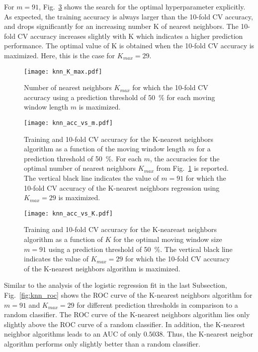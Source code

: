 For $m=91$, Fig.~\ref{fig:knn_acc_vs_K} shows the search for the optimal hyperparameter explicitly. As expected, the training accuracy is always larger than the 10-fold CV accuracy, and drops significantly for an increasing number K of nearest neighbors. The 10-fold CV accuracy increases slightly with K which indicates a higher prediction performance. The optimal value of K is obtained when the 10-fold CV accuracy is maximized. Here, this is the case for $K_{max}=29$.

\begin{figure}[h!]
  \centering
  \texttt{[image: knn\_K\_max.pdf]}
  \caption{Number of nearest neighbors $K_{max}$ for which the 10-fold CV accuracy using a prediction threshold of \SI{50}{\percent} for each moving window length $m$ is maximized.}
  \label{fig:knn_K_max}
\end{figure}

\begin{figure}[h!]
  \centering
  \texttt{[image: knn\_acc\_vs\_m.pdf]}
  \caption{Training and 10-fold CV accuracy for the K-nearest neighbors algorithm as a function of the moving window length $m$ for a prediction threshold of \SI{50}{\percent}. For each $m$, the accuracies for the optimal number of nearest neighbors $K_{max}$ from Fig.~\ref{fig:knn_K_max} is reported. The vertical black line indicates the value of $m=91$ for which the 10-fold CV accuracy of the K-nearest neighbors regression using $K_{max}=29$ is maximized.}
  \label{fig:knn_acc_vs_m}
\end{figure}

\begin{figure}[h!]
  \centering
  \texttt{[image: knn\_acc\_vs\_K.pdf]}
  \caption{Training and 10-fold CV accuracy for the K-neareast neighbors algorithm as a function of $K$ for the optimal moving window size $m=91$ using a prediction threshold of \SI{50}{\percent}. The vertical black line indicates the value of $K_{max} = 29$ for which the 10-fold CV accuracy of the K-nearest neighbors algorithm is maximized.}
  \label{fig:knn_acc_vs_K}
\end{figure}

Similar to the analysis of the logistic regression fit in the last Subsection, Fig.~\ref{fig:knn_roc} shows the ROC curve of the K-nearest neighbors algorithm for $m=91$ and $K_{max}=29$ for different prediction thresholds in comparison to a random classifier. The ROC curve of the K-nearest neighbors algorithm lies only slightly above the ROC curve of a random classifier. In addition, the K-nearest neighbor algorithms leads to an AUC of only $0.5038$. Thus, the K-nearest neigbor algorithm performs only slightly better than a random classifier. 

